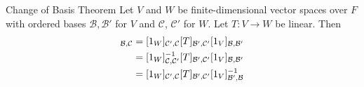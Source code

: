 \documentclass[class=article, crop=false]{standalone}
\begin{document}
  \begin{theorem}{Change of Basis Theorem}
    Let $V$ and $W$ be finite-dimensional vector spaces over $F$ with ordered bases $\mathcal{B}, \mathcal{B}'$ for $V$ and $\mathcal{C}$, $\mathcal{C}'$ for $W$. Let $T\colon V\to W$ be linear. Then
    \begin{align*}
      [T]_{\mathcal{B},\mathcal{C}} &= [1_W]_{\mathcal{C}',\mathcal{C}}[T]_{\mathcal{B}',\mathcal{C}'}[1_V]_{\mathcal{B},\mathcal{B}'} \\
      &= [1_W]_{\mathcal{C},\mathcal{C}'}\inv[T]_{\mathcal{B}',\mathcal{C}'}[1_V]_{\mathcal{B},\mathcal{B}'} \\
      &= [1_W]_{\mathcal{C}',\mathcal{C}}[T]_{\mathcal{B}',\mathcal{C}'}[1_V]_{\mathcal{B}',\mathcal{B}}\inv
    \end{align*}
  \end{theorem}
\end{document}
